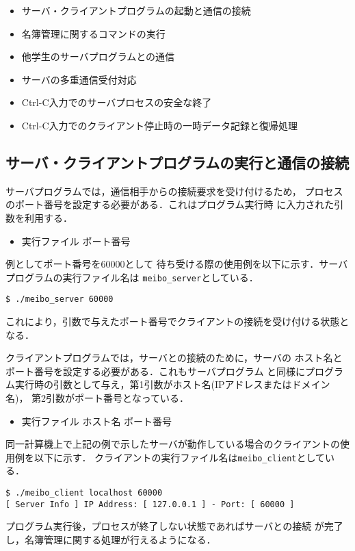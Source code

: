 \begin{itemize}
  \item サーバ・クライアントプログラムの起動と通信の接続
  \item 名簿管理に関するコマンドの実行
  \item 他学生のサーバプログラムとの通信
  \item サーバの多重通信受付対応
  \item Ctrl-C入力でのサーバプロセスの安全な終了
  \item Ctrl-C入力でのクライアント停止時の一時データ記録と復帰処理
\end{itemize}

\subsection{サーバ・クライアントプログラムの実行と通信の接続}
サーバプログラムでは，通信相手からの接続要求を受け付けるため，
プロセスのポート番号を設定する必要がある．これはプログラム実行時
に入力された引数を利用する．
\begin{itemize}
  \item 実行ファイル ポート番号
\end{itemize}

例としてポート番号を$60000$として
待ち受ける際の使用例を以下に示す．サーバプログラムの実行ファイル名は
\verb|meibo_server|としている．

\begin{Verbatim}[numbers=none, numbersep=6pt, frame=single,
                    fontsize=\small, baselinestretch=0.8]
$ ./meibo_server 60000
\end{Verbatim}
これにより，引数で与えたポート番号でクライアントの接続を受け付ける状態となる．

クライアントプログラムでは，サーバとの接続のために，サーバの
ホスト名とポート番号を設定する必要がある．これもサーバプログラム
と同様にプログラム実行時の引数として与え，第1引数がホスト名(IPアドレスまたはドメイン名)，
第2引数がポート番号となっている．
\begin{itemize}
  \item 実行ファイル ホスト名 ポート番号
\end{itemize}
同一計算機上で上記の例で示したサーバが動作している場合のクライアントの使用例を以下に示す．
クライアントの実行ファイル名は\verb|meibo_client|としている．

\begin{Verbatim}[numbers=none, numbersep=6pt, frame=single,
  fontsize=\small, baselinestretch=0.8]
$ ./meibo_client localhost 60000
[ Server Info ] IP Address: [ 127.0.0.1 ] - Port: [ 60000 ]
\end{Verbatim}
プログラム実行後，プロセスが終了しない状態であればサーバとの接続
が完了し，名簿管理に関する処理が行えるようになる．

